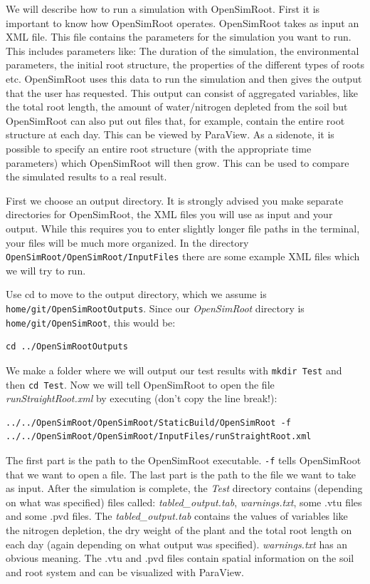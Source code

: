 \documentclass{article}
\begin{document}
\noindent We will describe how to run a simulation with OpenSimRoot. First it is important to know how OpenSimRoot operates. OpenSimRoot takes as input an XML file. This file contains the parameters for the simulation you want to run. This includes parameters like: The duration of the simulation, the environmental parameters, the initial root structure, the properties of the different types of roots etc. OpenSimRoot uses this data to run the simulation and then gives the output that the user has requested. This output can consist of aggregated variables, like the total root length, the amount of water/nitrogen depleted from the soil but OpenSimRoot can also put out files that, for example, contain the entire root structure at each day. This can be viewed by ParaView. As a sidenote, it is possible to specify an entire root structure (with the appropriate time parameters) which OpenSimRoot will then grow. This can be used to compare the simulated results to a real result. \newline

\noindent First we choose an output directory. It is strongly advised you make separate directories for OpenSimRoot, the XML files you will use as input and your output. While this requires you to enter slightly longer file paths in the terminal, your files will be much more organized. In the directory \verb|OpenSimRoot/OpenSimRoot/InputFiles| there are some example XML files which we will try to run. \newline

\noindent Use cd to move to the output directory, which we assume is \verb|home/git/OpenSimRootOutputs|. Since our \textit{OpenSimRoot} directory is \verb|home/git/OpenSimRoot|, this would be:
\begin{verbatim}
cd ../OpenSimRootOutputs
\end{verbatim}

\noindent We make a folder where we will output our test results with \verb|mkdir Test| and then \verb|cd Test|. Now we will tell OpenSimRoot to open the file \textit{runStraightRoot.xml} by executing (don't copy the line break!): 
\begin{verbatim}
../../OpenSimRoot/OpenSimRoot/StaticBuild/OpenSimRoot -f
../../OpenSimRoot/OpenSimRoot/InputFiles/runStraightRoot.xml
\end{verbatim}

\noindent The first part is the path to the OpenSimRoot executable. \verb|-f| tells OpenSimRoot that we want to open a file. The last part is the path to the file we want to take as input. After the simulation is complete, the \textit{Test} directory contains (depending on what was specified) files  called: \textit{tabled\_output.tab}, \textit{warnings.txt}, some .vtu files and some .pvd files. The \textit{tabled\_output.tab} contains the values of variables like the nitrogen depletion, the dry weight of the plant and the total root length on each day (again depending on what output was specified). \textit{warnings.txt} has an obvious meaning. The .vtu and .pvd files contain spatial information on the soil and root system and can be visualized with ParaView. \newline
\end{document}
